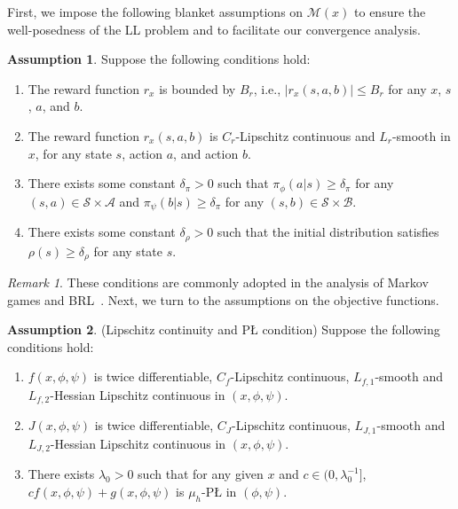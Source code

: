 \documentclass{article}
\theoremstyle{plain}
\theoremstyle{definition}
\newtheorem{assumption}{Assumption}
\theoremstyle{remark}
\newtheorem{remark}{Remark}
\def\cA{\mathcal A}
\def\cB{\mathcal B}
\def\cM{\mathcal M}
\def\cS{\mathcal S}
\begin{document}
First, we impose the following blanket assumptions on $\cM(x)$ to ensure the well-posedness of the LL problem and to facilitate our convergence analysis.
\begin{assumption}
\label{assump: mdp-assumptions-main}
Suppose the following conditions hold:
\vspace{-4mm}
    \begin{enumerate}
        \item The reward function $r_x$ is bounded by $B_r$, i.e., $|r_x(s,a,b)| \leq B_r$ for any $x$, $s$, $a$, and $b$.
        \vspace{-3mm}
        \item The reward function $r_x(s,a,b)$ is $C_r$-Lipschitz continuous and $L_r$-smooth in $x$, for any state $s$, action $a$, and action $b$.
        \vspace{-3mm}
        \item There exists some constant $\delta_\pi> 0$ such that  $\pi_\phi(a|s) \geq \delta_\pi$ for any $(s,a) \in \cS \times \cA$ and $\pi_\psi(b|s) \geq \delta_\pi$ for any $(s,b) \in \cS \times \cB$. 
        \vspace{-3mm}
        \item There exists some constant $\delta_\rho >0$ such that the initial distribution satisfies $\rho(s) \geq \delta_\rho$ for any state $s$.
    \end{enumerate}
\end{assumption}
\vspace{-2mm}
\begin{remark}
These conditions are commonly adopted in the analysis of Markov games and BRL~\citep{zeng2022regularized,gaur2025on}. Next, we turn to the assumptions on the objective functions.
\end{remark} 
\begin{assumption}
\label{assump:function-assumptions-main}
(Lipschitz continuity and P{\L} condition) Suppose the following conditions hold:
\vspace{-2mm}
\begin{enumerate}
\item $f(x,\phi,\psi)$ is twice differentiable, $C_f$-Lipschitz continuous, $L_{f,1}$-smooth and $L_{f,2}$-Hessian Lipschitz continuous in $(x,\phi,\psi)$.
\vspace{-3mm}
\item $J(x,\phi,\psi)$ is twice differentiable, $C_J$-Lipschitz continuous, $L_{J,1}$-smooth and $L_{J,2}$-Hessian Lipschitz continuous in $(x,\phi,\psi)$.
\vspace{-3mm}
\item There exists $\lambda_0>0$ such that for any given $x$ and $c \in (0,\lambda_0^{-1}]$, $c f(x,\phi,\psi) + g(x,\phi,\psi)$ is $\mu_h$-P{\L} in $(\phi,\psi)$.
\end{enumerate}
\end{assumption}
\vspace{-2mm}
\end{document}
